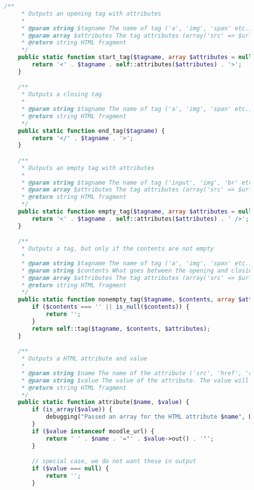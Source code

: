 \begin{lstlisting}[language=PHP]
    /**
     * Outputs an opening tag with attributes
     *
     * @param string $tagname The name of tag ('a', 'img', 'span' etc.)
     * @param array $attributes The tag attributes (array('src' => $url, 'class' => 'class1') etc.)
     * @return string HTML fragment
     */
    public static function start_tag($tagname, array $attributes = null) {
        return '<' . $tagname . self::attributes($attributes) . '>';
    }

    /**
     * Outputs a closing tag
     *
     * @param string $tagname The name of tag ('a', 'img', 'span' etc.)
     * @return string HTML fragment
     */
    public static function end_tag($tagname) {
        return '</' . $tagname . '>';
    }

    /**
     * Outputs an empty tag with attributes
     *
     * @param string $tagname The name of tag ('input', 'img', 'br' etc.)
     * @param array $attributes The tag attributes (array('src' => $url, 'class' => 'class1') etc.)
     * @return string HTML fragment
     */
    public static function empty_tag($tagname, array $attributes = null) {
        return '<' . $tagname . self::attributes($attributes) . ' />';
    }

    /**
     * Outputs a tag, but only if the contents are not empty
     *
     * @param string $tagname The name of tag ('a', 'img', 'span' etc.)
     * @param string $contents What goes between the opening and closing tags
     * @param array $attributes The tag attributes (array('src' => $url, 'class' => 'class1') etc.)
     * @return string HTML fragment
     */
    public static function nonempty_tag($tagname, $contents, array $attributes = null) {
        if ($contents === '' || is_null($contents)) {
            return '';
        }
        return self::tag($tagname, $contents, $attributes);
    }

    /**
     * Outputs a HTML attribute and value
     *
     * @param string $name The name of the attribute ('src', 'href', 'class' etc.)
     * @param string $value The value of the attribute. The value will be escaped with {@link s()}
     * @return string HTML fragment
     */
    public static function attribute($name, $value) {
        if (is_array($value)) {
            debugging("Passed an array for the HTML attribute $name", DEBUG_DEVELOPER);
        }
        if ($value instanceof moodle_url) {
            return ' ' . $name . '="' . $value->out() . '"';
        }

        // special case, we do not want these in output
        if ($value === null) {
            return '';
        }


\end{lstlisting}
